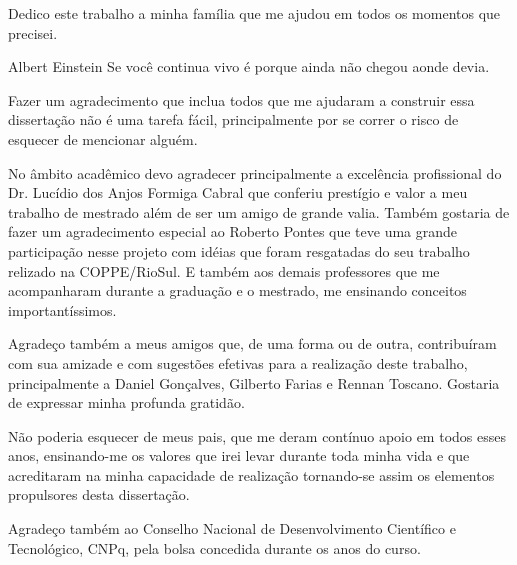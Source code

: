 \documentclass[oneside,normaltoc,espacoduplo,PGTEXdissertacao]{pgeeltex}
\begin{document}


\folhaderostoPGTEX
\folhadeaprovacaoPGTEX

\doublespacing
%
\begin{dedicatoriaPGTEX}
Dedico este trabalho a minha família que me ajudou em todos os momentos
que precisei.
\end{dedicatoriaPGTEX}


  

\begin{epigrafePGTEX}{Albert Einstein} 
Se você continua vivo é porque ainda não chegou aonde devia.
\end{epigrafePGTEX}


\begin{agradecimentosPGTEX} 
Fazer um agradecimento que inclua todos que me ajudaram a construir
essa dissertação não é uma tarefa fácil, principalmente por se correr
o risco de esquecer de mencionar alguém.

No âmbito acadêmico devo agradecer principalmente a excelência profissional do
Dr. Lucídio dos Anjos Formiga Cabral que conferiu prestígio e valor a meu
trabalho de mestrado além de ser um amigo de grande valia. Também gostaria de
fazer um agradecimento especial ao Roberto Pontes que teve uma grande
participação nesse projeto com idéias que foram resgatadas do seu trabalho
relizado na COPPE/RioSul. E também aos demais professores que me acompanharam
durante a graduação e o mestrado, me ensinando conceitos importantíssimos.

Agradeço também a meus amigos que, de uma forma ou de outra,
contribuíram com sua amizade e com sugestões efetivas para a realização deste
trabalho, principalmente a Daniel Gonçalves, Gilberto Farias e Rennan Toscano. 
Gostaria de expressar minha profunda gratidão.

Não poderia esquecer de meus pais, que me deram contínuo apoio em todos esses
anos, ensinando-me os valores que irei levar durante toda minha vida e que
acreditaram na minha capacidade de realização tornando-se assim os elementos
propulsores desta dissertação. 

Agradeço também ao Conselho Nacional de Desenvolvimento Científico e
Tecnológico, CNPq, pela bolsa concedida durante os anos do curso.

\end{agradecimentosPGTEX}
\end{document}
